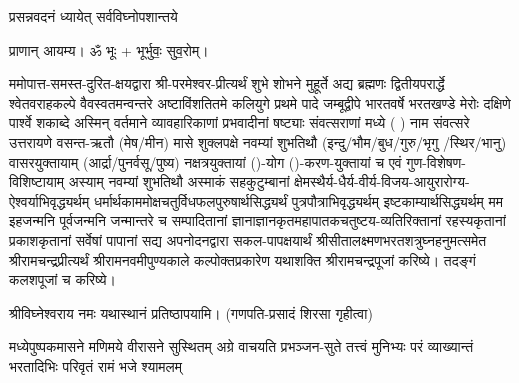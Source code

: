 
\setlength{\parindent}{0pt}





{प्रसन्नवदनं ध्यायेत् सर्वविघ्नोपशान्तये}
 
प्राणान्  आयम्य।  ॐ भूः + भूर्भुवः॒ सुव॒रोम्।


ममोपात्त-समस्त-दुरित-क्षयद्वारा श्री-परमेश्वर-प्रीत्यर्थं शुभे शोभने मुहूर्ते अद्य ब्रह्मणः
द्वितीयपरार्द्धे श्वेतवराहकल्पे वैवस्वतमन्वन्तरे अष्टाविंशतितमे कलियुगे प्रथमे पादे
जम्बूद्वीपे भारतवर्षे भरतखण्डे मेरोः दक्षिणे पार्श्वे शकाब्दे अस्मिन् वर्तमाने व्यावहारिकाणां प्रभवादीनां षष्ट्याः संवत्सराणां मध्ये (	) नाम संवत्सरे उत्तरायणे वसन्त-ऋतौ  (मेष/मीन) मासे 
शुक्लपक्षे नवम्यां शुभतिथौ (इन्दु/भौम/बुध/गुरु/भृगु /स्थिर/भानु) वासरयुक्तायाम्
(आर्द्रा/पुनर्वसू/पुष्य) नक्षत्रयुक्तायां ()-योग ()-करण-युक्तायां च एवं गुण-विशेषण-विशिष्टायाम्
अस्याम् नवम्यां शुभतिथौ अस्माकं सहकुटुम्बानां क्षेमस्थैर्य-धैर्य-वीर्य-विजय-आयुरारोग्य-ऐश्वर्याभिवृद्ध्यर्थम्
 धर्मार्थकाममोक्ष\-चतुर्विधफलपुरुषार्थसिद्ध्यर्थं पुत्रपौत्राभिवृद्ध्यर्थम् इष्टकाम्यार्थसिद्ध्यर्थम्
मम इहजन्मनि पूर्वजन्मनि जन्मान्तरे च सम्पादितानां ज्ञानाज्ञानकृतमहा\-पातकचतुष्टय-व्यतिरिक्तानां रहस्यकृतानां प्रकाशकृतानां सर्वेषां पापानां सद्य अपनोदनद्वारा सकल-पापक्षयार्थं 
श्रीसीतालक्ष्मणभरतशत्रुघ्नहनुमत्समेत श्रीरामचन्द्रप्रीत्यर्थं
श्रीरामनवमीपुण्यकाले कल्पोक्तप्रकारेण यथाशक्ति श्रीरामचन्द्रपूजां
करिष्ये।
तदङ्गं कलशपूजां च करिष्ये।


श्रीविघ्नेश्वराय नमः यथास्थानं प्रतिष्ठापयामि।
(गणपति-प्रसादं शिरसा गृहीत्वा)












 

{मध्येपुष्पकमासने मणिमये वीरासने सुस्थितम्}
{अग्रे वाचयति प्रभञ्जन-सुते तत्त्वं मुनिभ्यः परं}
{व्याख्यान्तं भरतादिभिः परिवृतं रामं भजे श्यामलम्}

